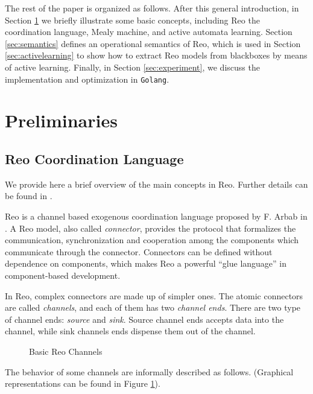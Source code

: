 \documentclass[conference, a4paper]{IEEEtran}
\begin{document}
The rest of the paper is organized as follows. After this general introduction, in Section
\ref{sec:preliminaries} we briefly illustrate some basic concepts, including Reo the coordination
language, Mealy machine, and active automata learning. Section \ref{sec:semantics} defines an
operational semantics of Reo, which is used in Section \ref{sec:activelearning} to show how to
extract Reo models from blackboxes by means of active learning. Finally, in Section
\ref{sec:experiment}, we discuss the implementation and optimization in \texttt{Golang}. 

\section{Preliminaries} 
\label{sec:preliminaries}
\subsection{Reo Coordination Language} 
\label{sec:reo}
We provide here a brief overview of the main concepts in Reo. Further details can be found in
\cite{DBLP:journals/mscs/Arbab04, DBLP:journals/scp/BaierSAR06}.

Reo is a channel based exogenous coordination language proposed by F. Arbab in
\cite{DBLP:journals/mscs/Arbab04}. 
A Reo model, also called \emph{connector}, provides the protocol
that formalizes the communication, synchronization and cooperation among the components which
communicate through the connector. Connectors can be defined without dependence on components,
which makes Reo a powerful ``glue language'' in component-based
development\cite{DBLP:journals/sigsoft/Gill03}.

In Reo, complex connectors are made up of simpler ones. The atomic connectors are called
\emph{channels}, and each of them has two \emph{channel ends}. There are two type of channel ends:
\emph{source} and \emph{sink}. Source channel ends accepts data into the channel, while sink
channels ends dispense them out of the channel. 

\begin{figure}[ht]
  \begin{center}
    
  \end{center}
  \caption{Basic Reo Channels}
  \label{fig:basic}
\end{figure}

The behavior of some channels are informally described as follows. (Graphical representations
can be found in Figure \ref{fig:basic}).
\end{document}
